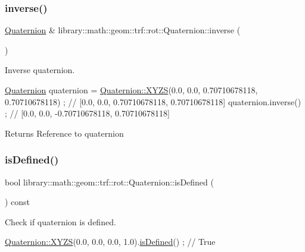 \subsubsection{\texorpdfstring{inverse()}{inverse()}}
{\footnotesize\ttfamily \hyperlink{classlibrary_1_1math_1_1geom_1_1trf_1_1rot_1_1_quaternion}{Quaternion} \& library\+::math\+::geom\+::trf\+::rot\+::\+Quaternion\+::inverse (\begin{DoxyParamCaption}{ }\end{DoxyParamCaption})}



Inverse quaternion. 


\begin{DoxyCode}
\hyperlink{classlibrary_1_1math_1_1geom_1_1trf_1_1rot_1_1_quaternion_aa7f459a08f5af38b9f7676a6bf36a21c}{Quaternion} quaternion = \hyperlink{classlibrary_1_1math_1_1geom_1_1trf_1_1rot_1_1_quaternion_afff9523c7dcbfbbc521736121e62ad41}{Quaternion::XYZS}(0.0, 0.0, 0.70710678118, 0.70710678118) 
      ; \textcolor{comment}{// [0.0, 0.0, 0.70710678118, 0.70710678118]}
quaternion.inverse() ; \textcolor{comment}{// [0.0, 0.0, -0.70710678118, 0.70710678118]}
\end{DoxyCode}


\begin{DoxyReturn}{Returns}
Reference to quaternion 
\end{DoxyReturn}
\mbox{\label{classlibrary_1_1math_1_1geom_1_1trf_1_1rot_1_1_quaternion_a0d74102b65b5fdb0cd92f37455cf8c66}} 
\subsubsection{\texorpdfstring{is\+Defined()}{isDefined()}}
{\footnotesize\ttfamily bool library\+::math\+::geom\+::trf\+::rot\+::\+Quaternion\+::is\+Defined (\begin{DoxyParamCaption}{ }\end{DoxyParamCaption}) const}



Check if quaternion is defined. 


\begin{DoxyCode}
\hyperlink{classlibrary_1_1math_1_1geom_1_1trf_1_1rot_1_1_quaternion_afff9523c7dcbfbbc521736121e62ad41}{Quaternion::XYZS}(0.0, 0.0, 0.0, 1.0).\hyperlink{classlibrary_1_1math_1_1geom_1_1trf_1_1rot_1_1_quaternion_a0d74102b65b5fdb0cd92f37455cf8c66}{isDefined}() ; \textcolor{comment}{// True}
\end{DoxyCode}



